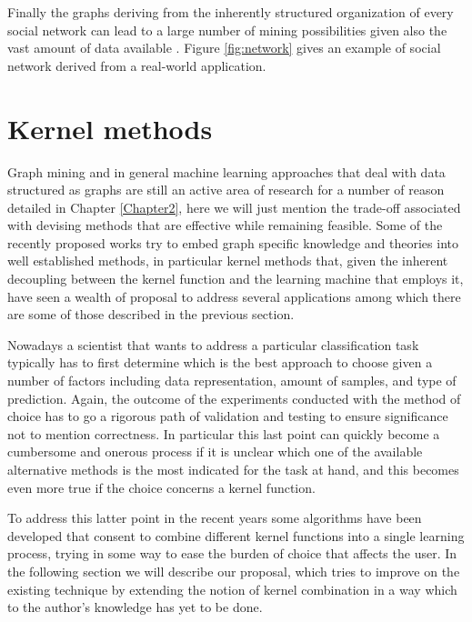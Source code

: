 Finally  the graphs deriving from the inherently structured organization of every social
network can lead to a large number of mining possibilities given also the vast
amount of data available \cite{gundecha2012mining}.
Figure \ref{fig:network} gives an example of social network derived from a real-world
application.


\section{Kernel methods}
Graph mining and in general machine learning approaches that deal with data
structured as graphs are still an active area of research for a number of reason
detailed in Chapter \ref{Chapter2}, here we will just mention the trade-off
associated with devising methods that are effective while remaining feasible.
Some of the recently proposed works \cite{DBLP:conf/sdm/MartinoNS12, NIPS2009_3813}
try to embed graph specific knowledge and theories into well established methods,
in particular kernel methods that, given the inherent decoupling between the kernel
function and the learning machine that employs it, have seen a wealth of proposal
to address several applications among which there are some of those described in
the previous section.

Nowadays a scientist that wants to address a particular classification task
typically has to first determine which is the best approach to choose given a number
of factors including data representation, amount of samples, and type of prediction.
Again, the outcome of the experiments conducted with the method of choice has 
to go a rigorous path of validation and testing to ensure significance not to
mention correctness.
In particular this last point can quickly become a cumbersome and onerous process if
it is unclear which one of the available alternative methods is the most indicated
for the task at hand, and this becomes even more true if the choice concerns a 
kernel function.

To address this latter point in the recent years some algorithms have been developed
\cite{journals/jmlr/GonenA11} that consent to combine different kernel functions into a single learning
process, trying in some way to ease the burden of choice that affects the user.
In the following section we will describe our proposal, which tries to improve on
the existing technique by extending the notion of kernel combination in a way which
to the author's knowledge has yet to be done.

